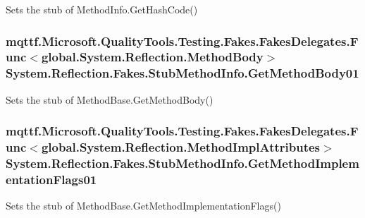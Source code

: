 Sets the stub of Method\-Info.\-Get\-Hash\-Code()

\hypertarget{class_system_1_1_reflection_1_1_fakes_1_1_stub_method_info_acdf100453c96cc01e5f731a51a4fb8d9}{
\subsubsection[{Get\-Method\-Body01}]{\setlength{\rightskip}{0pt plus 5cm}mqttf.\-Microsoft.\-Quality\-Tools.\-Testing.\-Fakes.\-Fakes\-Delegates.\-Func$<$global.\-System.\-Reflection.\-Method\-Body$>$ System.\-Reflection.\-Fakes.\-Stub\-Method\-Info.\-Get\-Method\-Body01}}\label{class_system_1_1_reflection_1_1_fakes_1_1_stub_method_info_acdf100453c96cc01e5f731a51a4fb8d9}


Sets the stub of Method\-Base.\-Get\-Method\-Body()

\hypertarget{class_system_1_1_reflection_1_1_fakes_1_1_stub_method_info_ac73fa250a93d442e4e24fccd4d641e1a}{
\subsubsection[{Get\-Method\-Implementation\-Flags01}]{\setlength{\rightskip}{0pt plus 5cm}mqttf.\-Microsoft.\-Quality\-Tools.\-Testing.\-Fakes.\-Fakes\-Delegates.\-Func$<$global.\-System.\-Reflection.\-Method\-Impl\-Attributes$>$ System.\-Reflection.\-Fakes.\-Stub\-Method\-Info.\-Get\-Method\-Implementation\-Flags01}}\label{class_system_1_1_reflection_1_1_fakes_1_1_stub_method_info_ac73fa250a93d442e4e24fccd4d641e1a}


Sets the stub of Method\-Base.\-Get\-Method\-Implementation\-Flags()

